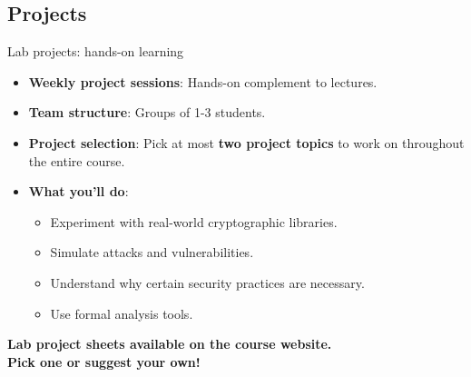 \documentclass[aspectratio=169, lualatex, handout]{beamer}
\begin{document}
\subsection{Projects}

\begin{frame}{Lab projects: hands-on learning}
	\begin{itemize}[<+->]
		\item \textbf{Weekly project sessions}: Hands-on complement to lectures.
		\item \textbf{Team structure}: Groups of 1-3 students.
		\item \textbf{Project selection}: Pick at most \textbf{two project topics} to work on throughout the entire course.
		\item \textbf{What you'll do}:
		      \begin{itemize}
			      \item Experiment with real-world cryptographic libraries.
			      \item Simulate attacks and vulnerabilities.
			      \item Understand why certain security practices are necessary.
			      \item Use formal analysis tools.
		      \end{itemize}
	\end{itemize}
	\vspace{0.1cm}
	\begin{center}
		\Large\textcolor{cipherprimary}{\textbf{Lab project sheets available on the course website. \\ Pick one or suggest your own!}}
	\end{center}
\end{frame}
\end{document}
